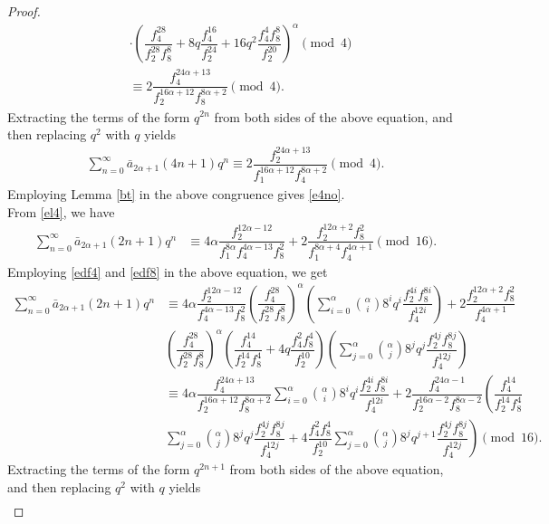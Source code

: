 \documentclass[10pt,a4paper]{amsart}
\begin{document}
\begin{proof}
\begin{align}
&\cdot\left(\dfrac{f_4^{28}}{f_2^{28}f_8^8}+8q\dfrac{f_4^{16}}{f_2^{24}}+16q^2 \dfrac{f_4^4f_8^8}{f_2^{20}}\right)^\alpha\pmod 4\label{el6}\\
&\equiv 2 \dfrac{f_4^{24\alpha+13}}{f_2^{16\alpha+12}f_8^{8\alpha+2}}
\pmod4.\nonumber
\end{align}
	Extracting the terms of the form $q^{2n}$ from both sides of the above equation, and then replacing $q^{2}$ with $q$ yields
\begin{align}\label{el5}
\sum_{n=0}^{\infty}\bar{a}_{2\alpha+1}(4n+1)q^n\equiv 2\dfrac{f_2^{24\alpha+13}}{f_1^{16\alpha+12}f_4^{8\alpha+2}}\pmod 4.
\end{align}
	Employing Lemma \ref{bt} in the above congruence gives \eqref{e4no}.\\
	\indent From \eqref{el4}, we have
	\begin{align*}
	\sum_{n=0}^{\infty}\bar{a}_{2\alpha+1}(2n+1)q^n
	&\equiv 4\alpha\dfrac{f_2^{12\alpha-12}}{f_1^{8\alpha}f_4^{4\alpha-13}f_8^2}+2\dfrac{f_2^{12\alpha+2}f_8^2}{f_1^{8\alpha+4}f_4^{4\alpha+1}}\pmod {16}.
	\end{align*}
	Employing \eqref{edf4} and \eqref{edf8} in the above equation, we get
	\begin{align*}
	\sum_{n=0}^{\infty}\bar{a}_{2\alpha+1}(2n+1)q^n&\equiv 4\alpha\dfrac{f_2^{12\alpha-12}}{f_4^{4\alpha-13}f_8^2}\left(\dfrac{f_4^{28}}{f_2^{28}f_8^8}\right)^\alpha\left(\sum_{i=0}^{\alpha}\binom{\alpha}{i}8^iq^i\dfrac{f_2^{4i}f_8^{8i}}{f_4^{12i}}\right)+2\dfrac{f_2^{12\alpha+2}f_8^2}{f_4^{4\alpha+1}}\\
	&\left(\dfrac{f_4^{28}}{f_2^{28}f_8^{8}}\right)^\alpha\left(\dfrac{f_4^{14}}{f_2^{14}f_8^4}+4q\dfrac{f_4^2f_8^4}{f_2^{10}}\right)\left(\sum_{j=0}^{\alpha}\binom{\alpha}{j}8^jq^j\dfrac{f_2^{4j}f_8^{8j}}{f_4^{12j}}\right)\\
	&\equiv 4\alpha\dfrac{f_4^{24\alpha+13}}{f_2^{16\alpha+12}f_8^{8\alpha+2}}\sum_{i=0}^{\alpha}\binom{\alpha}{i}8^iq^i\dfrac{f_2^{4i}f_8^{8i}}{f_4^{12i}}+2\dfrac{f_4^{24\alpha-1}}{f_2^{16\alpha-2}f_8^{8\alpha-2}}\left(\dfrac{f_4^{14}}{f_2^{14}f_8^4}\right.\\
	&\left.\sum_{j=0}^{\alpha}\binom{\alpha}{j}8^jq^j\dfrac{f_2^{4j}f_8^{8j}}{f_4^{12j}}+4\dfrac{f_4^2f_8^4}{f_2^{10}}\sum_{j=0}^{\alpha}\binom{\alpha}{j}8^jq^{j+1}\dfrac{f_2^{4j}f_8^{8j}}{f_4^{12j}}\right)\pmod{16}.
	\end{align*}
		Extracting the terms of the form $q^{2n+1}$ from both sides of the above equation, and then replacing $q^{2}$ with $q$ yields
	\begin{align}\label{el7}

\end{align}
\end{proof}
\end{document}
